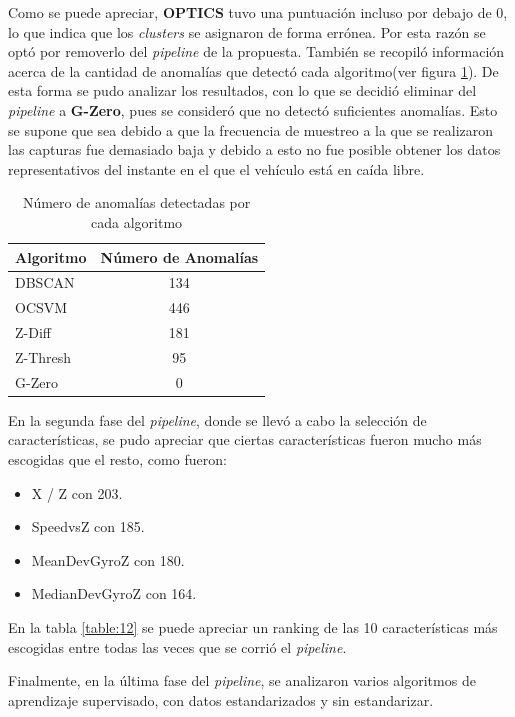 	Como se puede apreciar, \textbf{OPTICS} tuvo una puntuación incluso por debajo de 0, lo que indica que los \emph{clusters} se asignaron de 
	forma errónea. Por esta razón se optó por removerlo del \emph{pipeline} de la propuesta. También se recopiló información acerca de la
	cantidad de anomalías que detectó cada algoritmo(ver figura \ref{table:3}). De esta forma se pudo analizar los resultados, con lo que se decidió eliminar del \emph
	{pipeline} a \textbf{G-Zero}, pues se consideró que no detectó suficientes anomalías. Esto se supone que sea debido a que la frecuencia de
	muestreo a la que se realizaron las capturas fue demasiado baja y debido a esto no fue posible obtener los datos representativos del
	instante en el que el vehículo está en caída libre.

	\begin{table}[htb]
		\centering
		\caption{Número de anomalías detectadas por cada algoritmo}
		\label{table:3}
		\begin{tabular}{lc}
			\toprule
			 Algoritmo &  Número de Anomalías \\
			\midrule
				DBSCAN &                  134 \\
				 OCSVM &                  446 \\
				Z-Diff &                  181 \\
			   Z-Thresh &                   95 \\
				G-Zero &                    0 \\
			\bottomrule
		\end{tabular}
		
	\end{table}

	En la segunda fase del \emph{pipeline}, donde se llevó a cabo la selección de características, se pudo apreciar que ciertas características fueron
	mucho más escogidas que el resto, como fueron: 

	\begin{itemize}
		\item X / Z con 203.
		\item SpeedvsZ con 185.
		\item MeanDevGyroZ con 180.
		\item MedianDevGyroZ con 164.
	\end{itemize}

	En la tabla \ref{table:12} se puede apreciar un ranking de las 10 características más escogidas entre todas las veces que se corrió el \emph{pipeline}.

	Finalmente, en la última fase del \emph{pipeline}, se analizaron varios algoritmos de aprendizaje supervisado, con datos estandarizados y sin
	estandarizar. 
	\newpage

